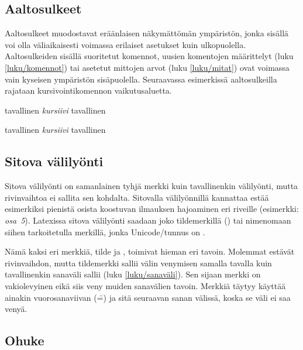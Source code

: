 \subsection{Aaltosulkeet}
\label{luku/aaltosulkeet}

Aaltosulkeet \mbox{\koodi{\{\}}} muodostavat eräänlaisen näkymättömän
ympäristön, jonka sisällä voi olla väliaikaisesti voimassa erilaiset
asetukset kuin ulkopuolella. Aaltosulkeiden sisällä suoritetut komennot,
uusien komentojen määrittelyt (luku \ref{luku/komennot}) tai asetetut
mittojen arvot (luku \ref{luku/mitat}) ovat voimassa vain kyseisen
ympäristön sisäpuolella. Seuraavassa esimerkissä aaltosulkeilla rajataan
kursivointikomennon  vaikutusaluetta.

\begin{koodilohkosis}
tavallinen {\itshape kursiivi} tavallinen
\end{koodilohkosis}

\begin{tulossis}
  tavallinen {\itshape kursiivi} tavallinen
\end{tulossis}

\subsection{Sitova välilyönti}

Sitova välilyönti on samanlainen tyhjä merkki kuin tavallinenkin
välilyönti, mutta rivinvaihtoa ei sallita sen kohdalta. Sitovalla
välilyönnillä kannattaa estää esimerkiksi pienistä osista koostuvan
ilmauksen hajoaminen eri riveille (esimerkki: \emph{osa~5}). Latexissa
sitova välilyönti saadaan joko tildemerkillä (\koodi{\textasciitilde})
tai nimenomaan siihen tarkoitetulla merkillä, jonka Unicode\-/tunnus on
.

Nämä kaksi eri merkkiä, tilde ja , toimivat hieman eri
tavoin. Molemmat estävät rivinvaihdon, mutta tildemerkki sallii välin
venymisen samalla tavalla kuin tavallinenkin sanaväli sallii (luku
\ref{luku/sanaväli}). Sen sijaan merkki  on
vakiolevyinen eikä siis veny muiden sanavälien tavoin. Merkkiä
 täytyy käyttää ainakin vuorosanaviivan (\==) ja sitä
seuraavan sanan välissä, koska se väli ei saa venyä.

\subsection{Ohuke}
\label{luku/ohuke}


